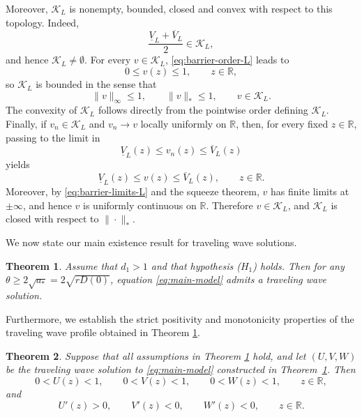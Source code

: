 \documentclass[preprint,sort&compress,final,12pt]{elsarticle}
\newtheorem{theorem}{Theorem}[section]
\numberwithin{equation}{section}
\begin{document}
Moreover, $\mathcal K_L$ is nonempty, bounded, closed and convex with respect to this topology. Indeed,
\begin{equation*}
\frac{\underline V_L+\overline V_L}{2}\in\mathcal K_L,
\end{equation*}
and hence $\mathcal K_L\neq\emptyset$. For every $v\in\mathcal K_L$, \eqref{eq:barrier-order-L}  leads to
\begin{equation*}
0\le v(z)\le1,\qquad z\in\mathbb R,
\end{equation*}
so $\mathcal K_L$ is bounded in the sense that
\begin{equation*}
\|v\|_\infty\le1,\qquad \|v\|_*\le1,\qquad v\in\mathcal K_L.
\end{equation*}
The convexity of $\mathcal K_L$ follows directly from the pointwise order defining $\mathcal K_L$. Finally, if $v_n\in\mathcal K_L$ and $v_n\to v$ locally uniformly on $\mathbb R$, then, for every fixed $z\in\mathbb R$, passing to the limit in
\begin{equation*}
\underline V_L(z)\le v_n(z)\le\overline V_L(z)
\end{equation*}
yields
\begin{equation*}
\underline V_L(z)\le v(z)\le\overline V_L(z),\qquad z\in\mathbb R.
\end{equation*}
Moreover, by \eqref{eq:barrier-limits-L} and the squeeze theorem, $v$ has finite limits at $\pm\infty$, and hence $v$ is uniformly continuous on $\mathbb R$. Therefore $v\in\mathcal K_L$, and $\mathcal K_L$ is closed with respect to $\|\cdot\|_*$.
\medskip

We now state our main existence result for traveling wave solutions.
\begin{theorem}\label{thm:main}
Assume that $d_1>1$ and that hypothesis ($H_1$) holds. Then for any $\theta\ge 2\sqrt{a_*}=2\sqrt{rD(0)}$, equation \eqref{eq:main-model} admits a traveling wave solution.
\end{theorem}

Furthermore, we establish the strict positivity and monotonicity properties of the traveling wave profile obtained in Theorem \ref{thm:main}.

\begin{theorem}\label{thm:pro}
Suppose that all assumptions in Theorem \ref{thm:main} hold, and let $(U,V,W)$ be the traveling wave solution to \eqref{eq:main-model} constructed in Theorem~\ref{thm:main}. Then
\begin{equation*}
0<U(z)<1,\qquad 0<V(z)<1,\qquad 0<W(z)<1,\qquad z\in\mathbb R,
\end{equation*}
and
\begin{equation*}
U'(z)>0,\qquad V'(z)<0,\qquad W'(z)<0,\qquad z\in\mathbb R.
\end{equation*}
\end{theorem}
\end{document}
